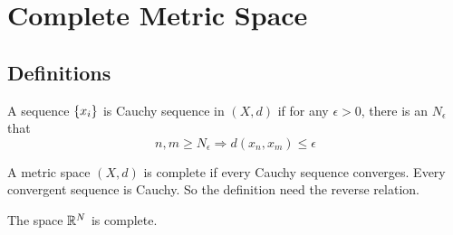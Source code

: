 \chapter{Complete Metric Space}


\section{Definitions}

\begin{definition}
    A sequence $\set{x_i}$ is Cauchy sequence in $(X, d)$ if for any $\epsilon > 0$, there is an $N_\epsilon$ that 
    \begin{equation}
        n, m \geq N_\epsilon \Rightarrow d(x_n, x_m) \leq \epsilon
    \end{equation}
\end{definition}

\begin{definition}
    A metric space $(X,d)$ is complete if every Cauchy sequence converges. Every convergent sequence is Cauchy. So the definition need the reverse relation.
\end{definition}


\begin{theorem}
    The space $\mathbb{R}^N$ is complete.
\end{theorem}


